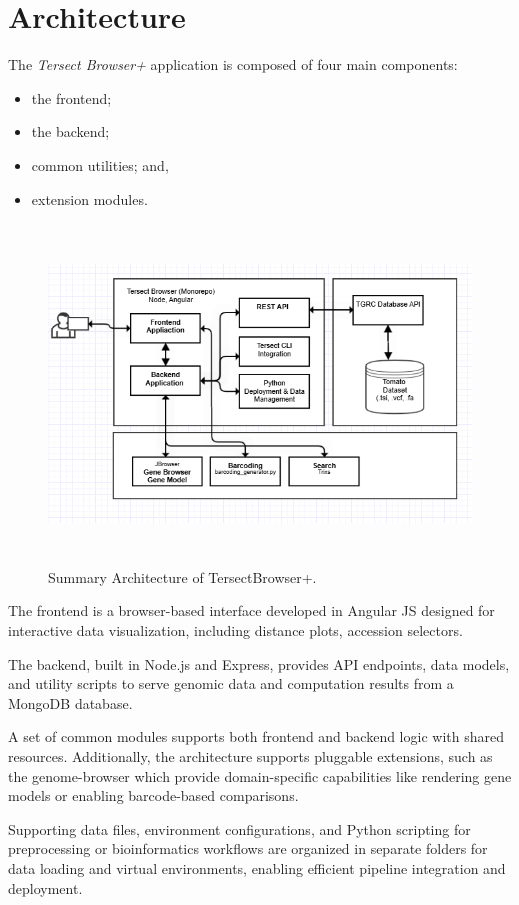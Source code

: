 \documentclass[12pt]{article}
\begin{document}
\section{Architecture}
The \textit{Tersect Browser+} application is composed of four main components: 
\begin{itemize}
    \item the frontend; 
    \item the backend; 
    \item common utilities; and, 
    \item extension modules.
\end{itemize} 

\begin{figure}[h]
    \centering
    \includegraphics[width=15cm, height=9cm]{high_level_arch_draft.png}
    \caption{Summary Architecture of TersectBrowser+.}
\end{figure}


The frontend is a browser-based interface developed in Angular JS designed for interactive data visualization, including distance plots, accession selectors. 

 The backend, built in Node.js and Express, provides API endpoints, data models, and utility scripts to serve genomic data and computation results from a MongoDB database.

 A set of common modules supports both frontend and backend logic with shared resources.  Additionally, the architecture supports pluggable extensions, such as the genome-browser which provide domain-specific capabilities like rendering gene models or enabling barcode-based comparisons. 

 Supporting data files, environment configurations, and Python scripting for preprocessing or bioinformatics workflows are organized in separate folders for data loading and virtual environments, enabling efficient pipeline integration and deployment.  
\end{document}

